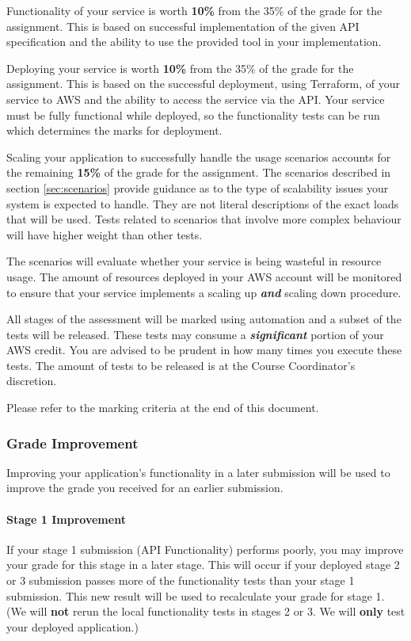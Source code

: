 \documentclass{csse4400}
\begin{document}
Functionality of your service is worth \textbf{10\%} from the 35\% of the grade for the assignment.
This is based on successful implementation of the given API specification
and the ability to use the provided tool in your implementation.

Deploying your service is worth \textbf{10\%} from the 35\% of the grade for the assignment.
This is based on the successful deployment, using Terraform,
of your service to AWS and the ability to access the service via the API.
Your service must be fully functional while deployed,
so the functionality tests can be run which determines the marks for deployment.

Scaling your application to successfully handle the usage scenarios accounts for the remaining \textbf{15\%}
of the grade for the assignment.
The scenarios described in section \ref{sec:scenarios} provide guidance
as to the type of scalability issues your system is expected to handle.
They are not literal descriptions of the exact loads that will be used.
Tests related to scenarios that involve more complex behaviour will have higher weight than other tests.

The scenarios will evaluate whether your service is being wasteful in resource usage.
The amount of resources deployed in your AWS account will be monitored to ensure that
your service implements a scaling up \textbf{\emph{and}} scaling down procedure.

All stages of the assessment will be marked using automation and a subset of the tests will be released.
These tests may consume a \textbf{\emph{significant}} portion of your AWS credit.
You are advised to be prudent in how many times you execute these tests.
The amount of tests to be released is at the Course Coordinator's discretion.

Please refer to the marking criteria at the end of this document.

\subsubsection{Grade Improvement}\label{sec:improve}
Improving your application's functionality in a later submission will be used to improve the grade you received for an earlier submission.

\paragraph{Stage 1 Improvement}
If your stage 1 submission (API Functionality) performs poorly, you may improve your grade for this stage in a later stage.
This will occur if your deployed stage 2 or 3 submission passes more of the functionality tests than your stage 1 submission.
This new result will be used to recalculate your grade for stage 1.
(We will \textbf{not} rerun the local functionality tests in stages 2 or 3. We will \textbf{only} test your deployed application.)
\end{document}
